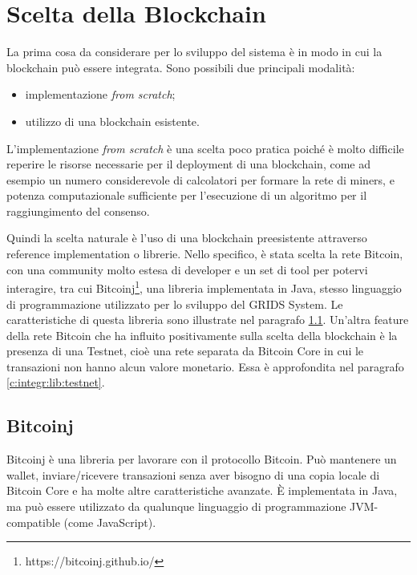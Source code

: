 
\section{Scelta della Blockchain}
\label{c:integr:lib}

La prima cosa da considerare per lo sviluppo del sistema è in modo in cui la blockchain può essere integrata. Sono possibili due principali modalità:
\begin{itemize}
    \item implementazione \textit{from scratch};
    \item utilizzo di una blockchain esistente.
\end{itemize}

L'implementazione \textit{from scratch} è una scelta poco pratica poiché è molto difficile reperire le risorse necessarie per il deployment di una blockchain, come ad esempio un numero considerevole di calcolatori per formare la rete di miners, e potenza computazionale sufficiente per l'esecuzione di un algoritmo per il raggiungimento del consenso.

Quindi la scelta naturale è l'uso di una blockchain preesistente attraverso reference implementation o librerie. Nello specifico, è stata scelta la rete Bitcoin, con una community molto estesa di developer e un set di tool per potervi interagire, tra cui Bitcoinj\footnote{https://bitcoinj.github.io/}, una libreria implementata in Java, stesso linguaggio di programmazione utilizzato per lo sviluppo del GRIDS System. Le caratteristiche di questa libreria sono illustrate nel paragrafo \ref{c:integr:lib:bitcoinj}.
Un'altra feature della rete Bitcoin che ha influito positivamente sulla scelta della blockchain è la presenza di una Testnet, cioè una rete separata da Bitcoin Core in cui le transazioni non hanno alcun valore monetario. Essa è approfondita nel paragrafo \ref{c:integr:lib:testnet}.


\subsection{Bitcoinj}
\label{c:integr:lib:bitcoinj}

Bitcoinj è una libreria per lavorare con il protocollo Bitcoin. Può mantenere un wallet, inviare/ricevere transazioni senza aver bisogno di una copia locale di Bitcoin Core e ha molte altre caratteristiche avanzate. È implementata in Java, ma può essere utilizzato da qualunque linguaggio di programmazione JVM-compatible (come JavaScript).


